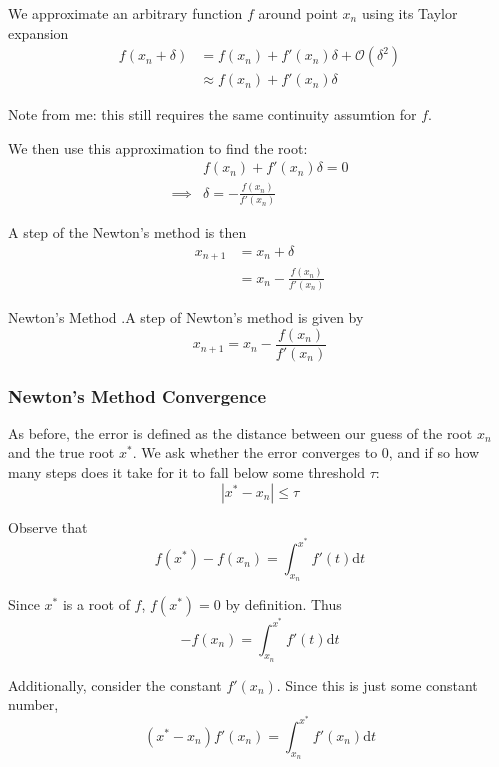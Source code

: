 \documentclass[12pt,letterpaper]{article}
\newcommand{\dd}{\mathrm{d}}
\newcommand{\bigO}{\mathcal{O}}
\begin{document}
We approximate an arbitrary function $f$ around point $x_n$ using its Taylor expansion
\begin{align}
	f(x_n + \delta) &= f(x_n) + f'(x_n) \delta + \bigO(\delta^2) \\
	&\approx f(x_n) + f'(x_n) \delta
\end{align}

Note from me: this still requires the same continuity assumtion for $f$.

We then use this approximation to find the root:
\begin{align}
	& f(x_n) + f'(x_n) \delta = 0 \\
	\implies & \delta = -\frac{f(x_n)}{f'(x_n)}
\end{align}

A step of the Newton's method is then
\begin{align}
	x_{n+1} &= x_n + \delta \\
	&= x_n - \frac{f(x_n)}{f'(x_n)}
\end{align}

\begin{algo}{Newton's Method}
.A step of Newton's method is given by
\begin{equation}
	x_{n+1} = x_n - \frac{f(x_n)}{f'(x_n)}
\end{equation}
\end{algo}


\subsubsection{Newton's Method Convergence}
As before, the error is defined as the distance between our guess of the root $x_n$ and the true root $x^*$. We ask whether the error converges to $0$, and if so how many steps does it take for it to fall below some threshold $\tau$:
\begin{equation}
	\left\lvert x^* - x_n \right\rvert \leq \tau
\end{equation}

Observe that
\begin{equation}
	f(x^*) - f(x_n) = \int_{x_n}^{x^*} f'(t) \dd t
\end{equation}

Since $x^*$ is a root of $f$, $f(x^*) = 0$ by definition. Thus
\begin{equation} \label{eq:newton_conv_1}
	-f(x_n) = \int_{x_n}^{x^*} f'(t) \dd t
\end{equation}

Additionally, consider the constant $f'(x_n)$. Since this is just some constant number,
\begin{equation} \label{eq:newton_conv_2}
	(x^* - x_n) f'(x_n) = \int_{x_n}^{x^*} f'(x_n) \dd t
\end{equation}
\end{document}
